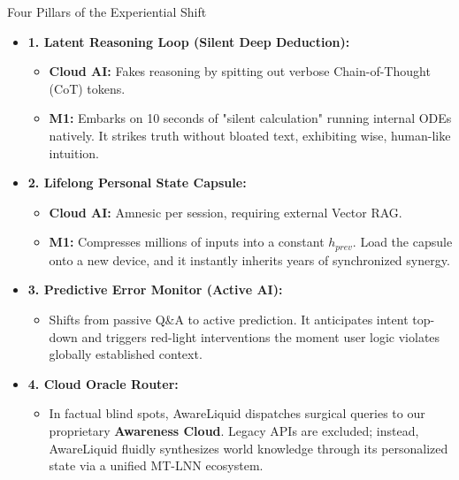 ﻿\documentclass[aspectratio=169, 10pt]{beamer}
\begin{document}
\begin{frame}{Four Pillars of the Experiential Shift}
\begin{itemize}
    \item \textbf{1. Latent Reasoning Loop (Silent Deep Deduction):}
    \begin{itemize}
        \item \textbf{Cloud AI:} Fakes reasoning by spitting out verbose Chain-of-Thought (CoT) tokens.
        \item \textbf{M1:} Embarks on 10 seconds of "silent calculation" running internal ODEs natively. It strikes truth without bloated text, exhibiting wise, human-like intuition.
    \end{itemize}
    \vspace{0.3em}
    \item \textbf{2. Lifelong Personal State Capsule:}
    \begin{itemize}
        \item \textbf{Cloud AI:} Amnesic per session, requiring external Vector RAG.
        \item \textbf{M1:} Compresses millions of inputs into a constant $h_{prev}$. Load the capsule onto a new device, and it instantly inherits years of synchronized synergy.
    \end{itemize}
    \vspace{0.3em}
    \item \textbf{3. Predictive Error Monitor (Active AI):}
    \begin{itemize}
        \item Shifts from passive Q\&A to active prediction. It anticipates intent top-down and triggers red-light interventions the moment user logic violates globally established context.
    \end{itemize}
    \vspace{0.3em}
    \item \textbf{4. Cloud Oracle Router:}
    \begin{itemize}
        \item In factual blind spots, AwareLiquid dispatches surgical queries to our proprietary \textbf{Awareness Cloud}. Legacy APIs are excluded; instead, AwareLiquid fluidly synthesizes world knowledge through its personalized state via a unified MT-LNN ecosystem.
    \end{itemize}
\end{itemize}
\end{frame}
\end{document}
